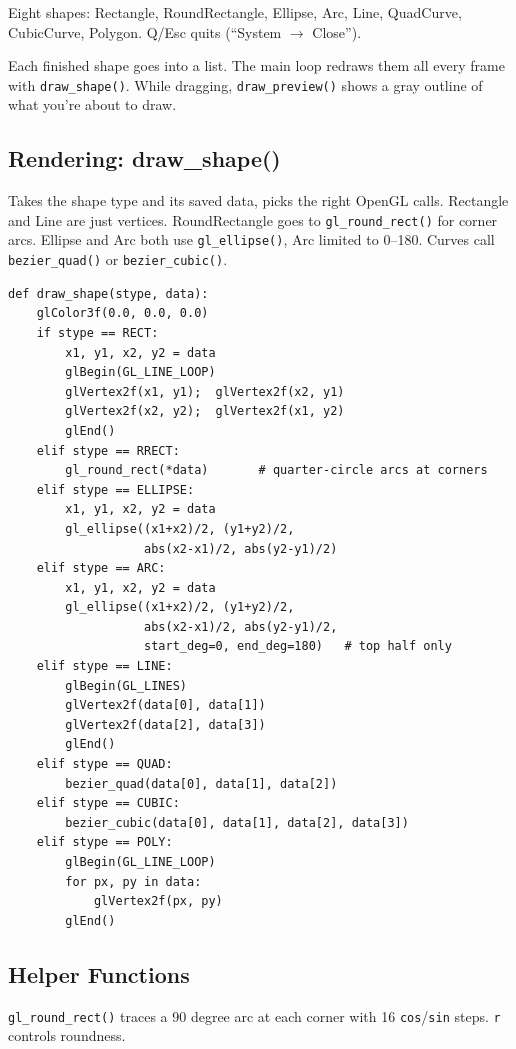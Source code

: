 \documentclass[12pt]{extreport}
\begin{document}
Eight shapes: Rectangle, RoundRectangle, Ellipse, Arc, Line, QuadCurve, CubicCurve, Polygon. Q/Esc quits (``System $\rightarrow$ Close'').

Each finished shape goes into a list. The main loop redraws them all every frame with \texttt{draw\_shape()}. While dragging, \texttt{draw\_preview()} shows a gray outline of what you're about to draw.

\subsection{Rendering: draw\_shape()}

Takes the shape type and its saved data, picks the right OpenGL calls. Rectangle and Line are just vertices. RoundRectangle goes to \texttt{gl\_round\_rect()} for corner arcs. Ellipse and Arc both use \texttt{gl\_ellipse()}, Arc limited to 0--180. Curves call \texttt{bezier\_quad()} or \texttt{bezier\_cubic()}.

\begin{lstlisting}[style=pythonstyle]
def draw_shape(stype, data):
    glColor3f(0.0, 0.0, 0.0)
    if stype == RECT:
        x1, y1, x2, y2 = data
        glBegin(GL_LINE_LOOP)
        glVertex2f(x1, y1);  glVertex2f(x2, y1)
        glVertex2f(x2, y2);  glVertex2f(x1, y2)
        glEnd()
    elif stype == RRECT:
        gl_round_rect(*data)       # quarter-circle arcs at corners
    elif stype == ELLIPSE:
        x1, y1, x2, y2 = data
        gl_ellipse((x1+x2)/2, (y1+y2)/2,
                   abs(x2-x1)/2, abs(y2-y1)/2)
    elif stype == ARC:
        x1, y1, x2, y2 = data
        gl_ellipse((x1+x2)/2, (y1+y2)/2,
                   abs(x2-x1)/2, abs(y2-y1)/2,
                   start_deg=0, end_deg=180)   # top half only
    elif stype == LINE:
        glBegin(GL_LINES)
        glVertex2f(data[0], data[1])
        glVertex2f(data[2], data[3])
        glEnd()
    elif stype == QUAD:
        bezier_quad(data[0], data[1], data[2])
    elif stype == CUBIC:
        bezier_cubic(data[0], data[1], data[2], data[3])
    elif stype == POLY:
        glBegin(GL_LINE_LOOP)
        for px, py in data:
            glVertex2f(px, py)
        glEnd()
\end{lstlisting}

\subsection{Helper Functions}

\texttt{gl\_round\_rect()} traces a 90 degree arc at each corner with 16 \texttt{cos}/\texttt{sin} steps. \texttt{r} controls roundness.
\end{document}
